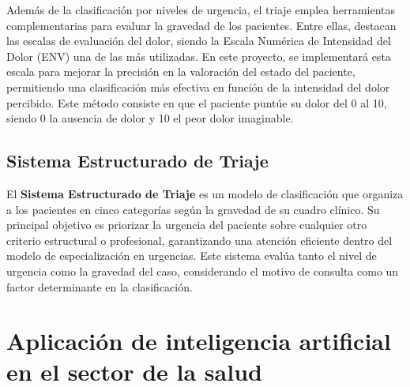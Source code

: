 Además de la clasificación por niveles de urgencia, el triaje emplea herramientas complementarias para evaluar la gravedad de los pacientes. Entre ellas, destacan las escalas de evaluación del dolor, siendo la Escala Numérica de Intensidad del Dolor (ENV) una de las más utilizadas. En este proyecto, se implementará esta escala para mejorar la precisión en la valoración del estado del paciente, permitiendo una clasificación más efectiva en función de la intensidad del dolor percibido.
Este método consiste en que el paciente puntúe su dolor del 0 al 10, siendo 0 la ausencia de dolor y 10 el peor dolor imaginable. \cite{EscalaDolorCM}
\subsection{Sistema Estructurado de Triaje}

El \textbf{Sistema Estructurado de Triaje} es un modelo de clasificación que organiza a los pacientes en cinco categorías según la gravedad de su cuadro clínico. Su principal objetivo es priorizar la urgencia del paciente sobre cualquier otro criterio estructural o profesional, garantizando una atención eficiente dentro del modelo de especialización en urgencias. Este sistema evalúa tanto el nivel de urgencia como la gravedad del caso, considerando el motivo de consulta como un factor determinante en la clasificación. \cite{SET_triaje}\cite{triaje_espana}

\section{Aplicación de inteligencia artificial en el sector de la salud}